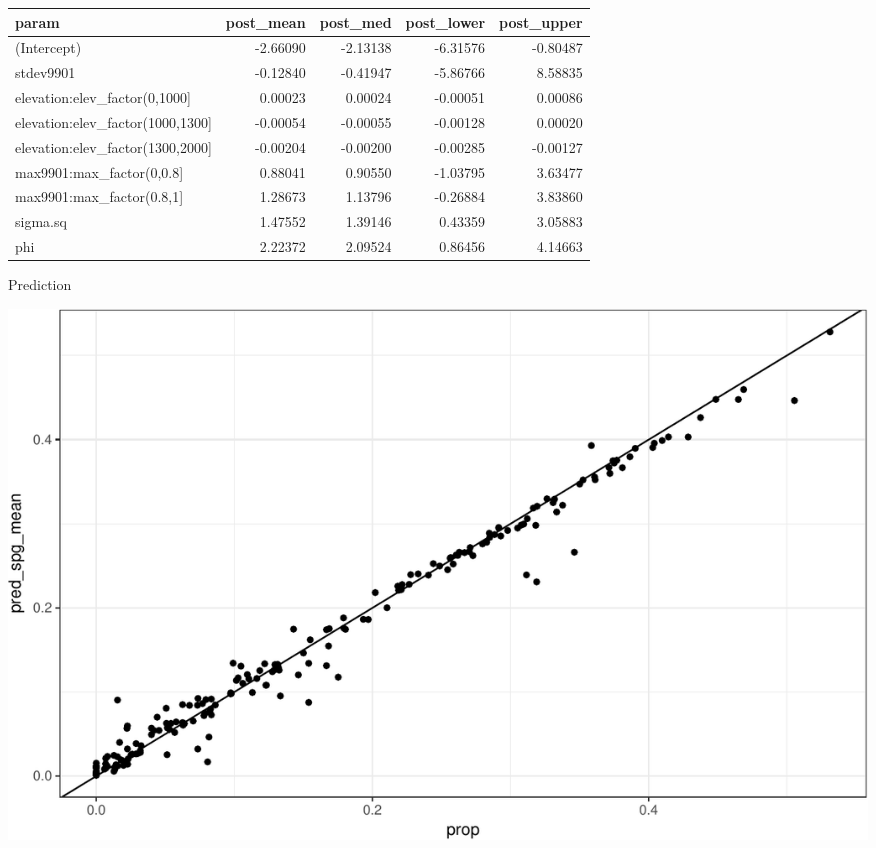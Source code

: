 \documentclass[11pt,ignorenonframetext,]{beamer}
\newenvironment{Shaded}{}{}
\newcommand{\KeywordTok}[1]{\textcolor[rgb]{0.00,0.44,0.13}{\textbf{#1}}}
\newcommand{\DataTypeTok}[1]{\textcolor[rgb]{0.56,0.13,0.00}{#1}}
\newcommand{\DecValTok}[1]{\textcolor[rgb]{0.25,0.63,0.44}{#1}}
\newcommand{\StringTok}[1]{\textcolor[rgb]{0.25,0.44,0.63}{#1}}
\newcommand{\OperatorTok}[1]{\textcolor[rgb]{0.40,0.40,0.40}{#1}}
\newcommand{\NormalTok}[1]{#1}
\let\oldShaded\Shaded
\let\endoldShaded\endShaded
\renewenvironment{Shaded}{\footnotesize\begin{spacing}{0.9}\oldShaded}{\endoldShaded\end{spacing}}
\begin{document}
\begin{frame}[fragile]{}

\footnotesize

\begin{Shaded}
\end{Shaded}

\begin{longtable}[]{@{}lrrrr@{}}
\toprule
param & post\_mean & post\_med & post\_lower &
post\_upper\tabularnewline
\midrule
\endhead
(Intercept) & -2.66090 & -2.13138 & -6.31576 & -0.80487\tabularnewline
stdev9901 & -0.12840 & -0.41947 & -5.86766 & 8.58835\tabularnewline
elevation:elev\_factor(0,1000{]} & 0.00023 & 0.00024 & -0.00051 &
0.00086\tabularnewline
elevation:elev\_factor(1000,1300{]} & -0.00054 & -0.00055 & -0.00128 &
0.00020\tabularnewline
elevation:elev\_factor(1300,2000{]} & -0.00204 & -0.00200 & -0.00285 &
-0.00127\tabularnewline
max9901:max\_factor(0,0.8{]} & 0.88041 & 0.90550 & -1.03795 &
3.63477\tabularnewline
max9901:max\_factor(0.8,1{]} & 1.28673 & 1.13796 & -0.26884 &
3.83860\tabularnewline
sigma.sq & 1.47552 & 1.39146 & 0.43359 & 3.05883\tabularnewline
phi & 2.22372 & 2.09524 & 0.86456 & 4.14663\tabularnewline
\bottomrule
\end{longtable}

\end{frame}

\begin{frame}{Prediction}

\includegraphics{Lec21_files/figure-beamer/unnamed-chunk-14-1.pdf}

\end{frame}
\end{document}

